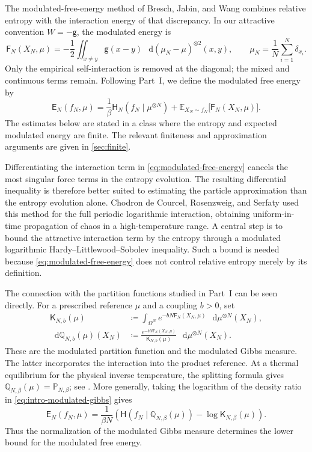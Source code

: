 \documentclass[11pt,reqno]{amsart}
\numberwithin{equation}{section}
\theoremstyle{definition}
\theoremstyle{remark}
\newcommand{\E}{\mathbb E}
\newcommand{\g}{\mathsf g}
\newcommand{\Hr}{\mathsf H}
\newcommand{\Fr}{\mathsf F}
\newcommand{\Er}{\mathsf E}
\newcommand{\K}{\mathsf K}
\newcommand{\Q}{\mathbb Q}
\newcommand{\Pb}{\mathbb P}
\newcommand{\dd}{\mathop{}\!\mathrm d}
\begin{document}
The modulated-free-energy method of Bresch, Jabin, and Wang \cite{BJW} combines relative entropy with the interaction energy of that discrepancy. In our attractive convention $W=-\g$, the modulated energy is
\begin{equation}\label{eq:modulated-energy}
 \Fr_N(X_N,\mu)
 =-\frac12\iint_{x\ne y}\g(x-y)
                    \,\dd(\mu_N-\mu)^{\otimes2}(x,y),
 \qquad \mu_N=\frac1N\sum_{i=1}^N\delta_{x_i}.
\end{equation}
Only the empirical self-interaction is removed at the diagonal; the mixed and continuous terms remain. Following Part~I, we define the modulated free energy by
\begin{equation}\label{eq:modulated-free-energy}
 \Er_N(f_N,\mu)
 =\frac1\beta\Hr_N(f_N\mid\mu^{\otimes N})
       +\E_{X_N\sim f_N}\bigl[\Fr_N(X_N,\mu)\bigr].
\end{equation}
The estimates below are stated in a class where the entropy and expected modulated energy are finite. The relevant finiteness and approximation arguments are given in \cref{sec:finite}.

Differentiating the interaction term in \eqref{eq:modulated-free-energy} cancels the most singular force terms in the entropy evolution. The resulting differential inequality is therefore better suited to estimating the particle approximation than the entropy evolution alone. Chodron de Courcel, Rosenzweig, and Serfaty \cite{CdCRS} used this method for the full periodic logarithmic interaction, obtaining uniform-in-time propagation of chaos in a high-temperature range. A central step is to bound the attractive interaction term by the entropy through a modulated logarithmic Hardy--Littlewood--Sobolev inequality. Such a bound is needed because \eqref{eq:modulated-free-energy} does not control relative entropy merely by its definition.

The connection with the partition functions studied in Part~I can be seen directly. For a prescribed reference $\mu$ and a coupling $b>0$, set
\begin{align}
 \K_{N,b}(\mu)
 &\coloneqq\int_{\Omega^N}e^{-bN\Fr_N(X_N,\mu)}\,\dd\mu^{\otimes N}(X_N),
 \label{eq:modulated-partition}\\
 \dd\Q_{N,b}(\mu)(X_N)
 &\coloneqq\frac{e^{-bN\Fr_N(X_N,\mu)}}{\K_{N,b}(\mu)}
              \,\dd\mu^{\otimes N}(X_N).
 \label{eq:intro-modulated-gibbs}
\end{align}
These are the modulated partition function and the modulated Gibbs measure. The latter incorporates the interaction into the product reference. At a thermal equilibrium for the physical inverse temperature, the splitting formula gives $\Q_{N,\beta}(\mu)=\Pb_{N,\beta}$; see \cite[Remark~2.1]{PartI}. More generally, taking the logarithm of the density ratio in \eqref{eq:intro-modulated-gibbs} gives
\begin{equation}\label{eq:intro-free-energy-rewriting}
 \Er_N(f_N,\mu)
 =\frac1{\beta N}\left(
   \Hr(f_N\mid\Q_{N,\beta}(\mu))
      -\log\K_{N,\beta}(\mu)\right).
\end{equation}
Thus the normalization of the modulated Gibbs measure determines the lower bound for the modulated free energy.
\end{document}

